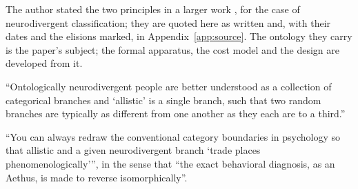 The author stated the two principles in a larger work \cite{Aethus}, for the case of neurodivergent classification; they are quoted here as written and, with their dates and the elisions marked, in Appendix~\ref{app:source}. The ontology they carry is the paper's subject; the formal apparatus, the cost model and the design are developed from it.

\begin{principle}
\label{prin:branch}
``Ontologically neurodivergent people are better understood as a collection of categorical branches and `allistic' is a single branch, such that two random branches are typically as different from one another as they each are to a third.''
\end{principle}

\begin{principle}
\label{prin:symmetry}
``You can always redraw the conventional category boundaries in psychology so that allistic and a given neurodivergent branch `trade places phenomenologically'{}'', in the sense that ``the exact behavioral diagnosis, as an Aethus, is made to reverse isomorphically''.
\end{principle}

